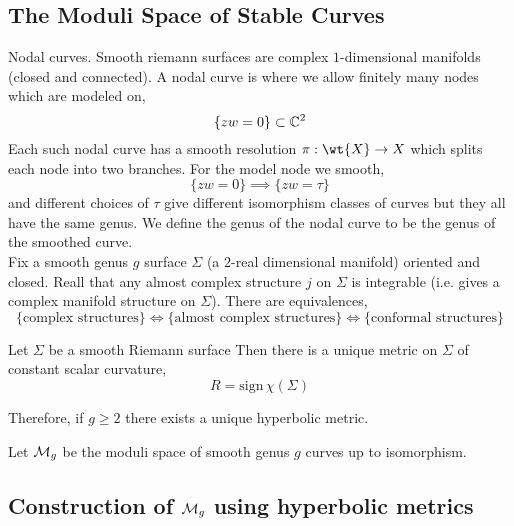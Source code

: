 \documentclass[12pt]{article}
\begin{document}
\subsection{The Moduli Space of Stable Curves}

Nodal curves. Smooth riemann surfaces are complex $1$-dimensional manifolds (closed and connected). A nodal curve is where we allow finitely many nodes which are modeled on,
\[ \{ zw = 0 \} \subset \mathbb{C}^2 \]
Each such nodal curve has a smooth resolution $\pi : \wt{X} \to X$ which splits each node into two branches. For the model node we smooth,
\[ \{ zw = 0 \} \implies \{ zw = \tau \} \]
and different choices of $\tau$ give different isomorphism classes of curves but they all have the same genus. We define the genus of the nodal curve to be the genus of the smoothed curve. 
\bigskip\\
Fix a smooth genus $g$ surface $\Sigma$ (a $2$-real dimensional manifold) oriented and closed. Reall that any almost complex structure $j$ on $\Sigma$ is integrable (i.e. gives a complex manifold structure on $\Sigma$). There are equivalences,
\[ \{ \text{complex structures} \} \iff \{ \text{almost complex structures} \} \iff \{ \text{conformal structures} \} \]

\begin{thm}[Uniformization]
Let $\Sigma$ be a smooth Riemann surface Then there is a unique metric on $\Sigma$ of constant scalar curvature,
\[ R = \mathrm{sign} \, \chi(\Sigma) \]
\end{thm}

\begin{rmk}
Therefore, if $g \ge 2$ there exists a unique hyperbolic metric. 
\end{rmk}

\begin{defn}
Let $\mathcal{M}_g$ be the moduli space of smooth genus $g$ curves up to isomorphism. 
\end{defn}

\subsection{Construction of $\mathcal{M}_g$ using hyperbolic metrics}
\end{document}
